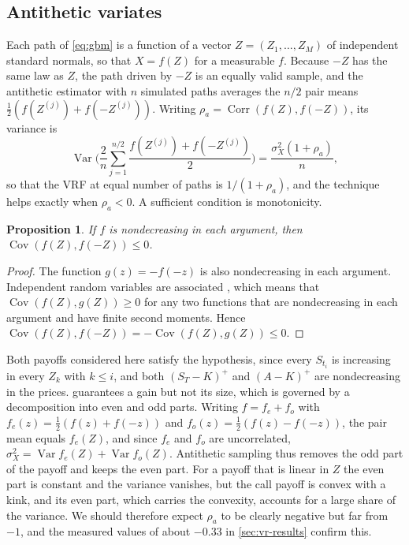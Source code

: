\documentclass[11pt,a4paper]{article}
\newtheorem{proposition}{Proposition}[section]
\newcommand{\Var}{\operatorname{Var}}
\newcommand{\Cov}{\operatorname{Cov}}
\newcommand{\Corr}{\operatorname{Corr}}
\begin{document}
\subsection{Antithetic variates}\label{sec:anti}

Each path of \cref{eq:gbm} is a function of a vector $Z=(Z_1,\dots,Z_M)$ of independent standard normals, so that $X=f(Z)$ for a measurable $f$.
Because $-Z$ has the same law as $Z$, the path driven by $-Z$ is an equally valid sample, and the antithetic estimator with $n$ simulated paths averages the $n/2$ pair means $\frac12(f(Z^{(j)})+f(-Z^{(j)}))$.
Writing $\rho_a = \Corr(f(Z),f(-Z))$, its variance is
\begin{equation}\label{eq:anti}
\Var\Big(\frac{2}{n}\sum_{j=1}^{n/2}\frac{f(Z^{(j)})+f(-Z^{(j)})}{2}\Big) = \frac{\sigma_X^2(1+\rho_a)}{n},
\end{equation}
so that the VRF at equal number of paths is $1/(1+\rho_a)$, and the technique helps exactly when $\rho_a<0$.
A sufficient condition is monotonicity.

\begin{proposition}\label{prop:anti}
If $f$ is nondecreasing in each argument, then $\Cov(f(Z),f(-Z))\le0$.
\end{proposition}

\begin{proof}
The function $g(z) = -f(-z)$ is also nondecreasing in each argument.
Independent random variables are associated \citep{esary1967}, which means that $\Cov(f(Z),g(Z))\ge0$ for any two functions that are nondecreasing in each argument and have finite second moments.
Hence $\Cov(f(Z),f(-Z)) = -\Cov(f(Z),g(Z)) \le 0$.
\end{proof}

Both payoffs considered here satisfy the hypothesis, since every $S_{t_i}$ is increasing in every $Z_k$ with $k\le i$, and both $(S_T-K)^+$ and $(A-K)^+$ are nondecreasing in the prices.
 guarantees a gain but not its size, which is governed by a decomposition into even and odd parts.
Writing $f = f_e + f_o$ with $f_e(z) = \frac12(f(z)+f(-z))$ and $f_o(z)=\frac12(f(z)-f(-z))$, the pair mean equals $f_e(Z)$, and since $f_e$ and $f_o$ are uncorrelated, $\sigma_X^2 = \Var f_e(Z) + \Var f_o(Z)$.
Antithetic sampling thus removes the odd part of the payoff and keeps the even part.
For a payoff that is linear in $Z$ the even part is constant and the variance vanishes, but the call payoff is convex with a kink, and its even part, which carries the convexity, accounts for a large share of the variance.
We should therefore expect $\rho_a$ to be clearly negative but far from $-1$, and the measured values of about $-0.33$ in \cref{sec:vr-results} confirm this.
\end{document}
